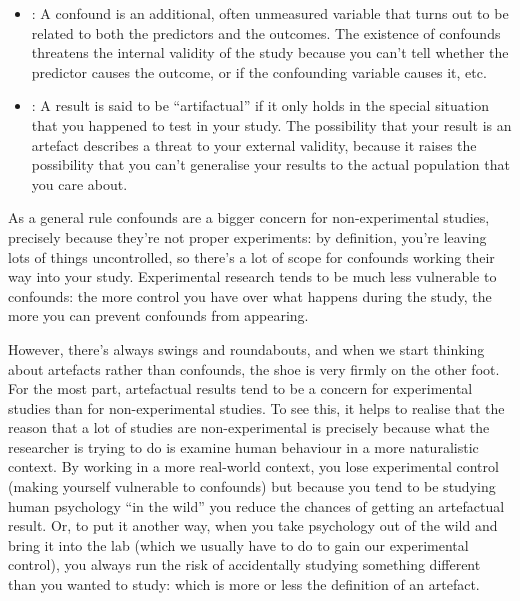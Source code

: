 \begin{itemize}
\item {}: A confound is an additional, often unmeasured variable that turns out to be related to both the predictors and the outcomes. The existence of confounds threatens the internal validity of the study because you can't tell whether the predictor causes the outcome, or if the confounding variable causes it, etc.
\item {}: A result is said to be ``artifactual'' if it only holds in the special situation that you happened to test in your study. The possibility that your result is an artefact describes a threat to your external validity, because it raises the possibility that you can't generalise your results to the actual population that you care about.
\end{itemize}

\noindent
As a general rule confounds are a bigger concern for non-experimental studies, precisely because they're not proper experiments: by definition, you're leaving lots of things uncontrolled, so there's a lot of scope for confounds working their way into your study. Experimental research tends to be much less vulnerable to confounds: the more control you have over what happens during the study, the more you can prevent confounds from appearing.

However, there's always swings and roundabouts, and when we start thinking about artefacts rather than confounds, the shoe is very firmly on the other foot. For the most part, artefactual results tend to be a concern for experimental studies than for non-experimental studies. To see this, it helps to realise that the reason that a lot of studies are non-experimental is precisely because what the researcher is trying to do is examine human behaviour in a more naturalistic context. By working in a more real-world context, you lose experimental control (making yourself vulnerable to confounds) but because you tend to be studying human psychology ``in the wild'' you reduce the chances of getting an artefactual result. Or, to put it another way, when you take psychology out of the wild and bring it into the lab (which we usually have to do to gain our experimental control), you always run the risk of accidentally studying something different than you wanted to study: which is more or less the definition of an artefact.

